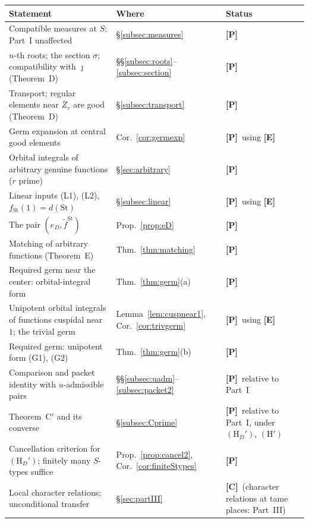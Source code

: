 \documentclass[12pt]{article}
\newcommand{\ov}[1]{\overline{#1}}
\newcommand{\St}{\mathrm{St}}
\newcommand{\Zb}{\ov{Z}}
\newcommand{\jj}{\jmath}
\newcommand{\sg}{\sigma}
\newcommand{\Pv}{\textbf{[P]}}
\newcommand{\Ev}{\textbf{[E]}}
\newcommand{\Cv}{\textbf{[C]}}
\theoremstyle{plain}
\theoremstyle{definition}
\begin{document}
\begin{center}
\begin{tabular}{>{\raggedright\arraybackslash}p{}>{\raggedright\arraybackslash}p{}>{\raggedright\arraybackslash}p{}}
\toprule
Statement & Where & Status\\
\midrule
Compatible measures at $S$; Part~I unaffected & \S\ref{subsec:measures} & \Pv\\
$n$-th roots; the section $\sg$; compatibility with $\jj$ (Theorem~D) & \S\S\ref{subsec:roots}--\ref{subsec:section} & \Pv\\
Transport; regular elements near $\Zb_v$ are good (Theorem~D) & \S\ref{subsec:transport} & \Pv\\
Germ expansion at central good elements & Cor.~\ref{cor:germexp} & \Pv\ using \Ev\\
Orbital integrals of arbitrary genuine functions ($r$ prime) & \S\ref{sec:arbitrary} & \Pv\\
Linear inputs (L1), (L2), $f_{\St}(1)=d(\St)$ & \S\ref{subsec:linear} & \Pv\ using \Ev\\
The pair $(e_D,\tilde f^{\St})$ & Prop.~\ref{prop:eD} & \Pv\\
Matching of arbitrary functions (Theorem~E) & Thm.~\ref{thm:matching} & \Pv\\
Required germ near the center: orbital-integral form & Thm.~\ref{thm:germ}(a) & \Pv\\
Unipotent orbital integrals of functions cuspidal near $1$; the trivial germ & Lemma~\ref{lem:cuspnear1}, Cor.~\ref{cor:trivgerm} & \Pv\ using \Ev\\
Required germ: unipotent form (G1), (G2) & Thm.~\ref{thm:germ}(b) & \Pv\\
Comparison and packet identity with $u$-admissible pairs & \S\S\ref{subsec:uadm}--\ref{subsec:packet2} & \Pv\ relative to Part~I\\
Theorem~C$'$ and its converse & \S\ref{subsec:Cprime} & \Pv\ relative to Part~I, under $(\mathrm H_D')$, $(\mathrm H')$\\
Cancellation criterion for $(\mathrm H_D')$; finitely many $S$-types suffice & Prop.~\ref{prop:cancel2}, Cor.~\ref{cor:finiteStypes} & \Pv\\
Local character relations; unconditional transfer & \S\ref{sec:partIII} & \Cv\ (character relations at tame places: Part~III)\\
\bottomrule
\end{tabular}
\end{center}
\end{document}
